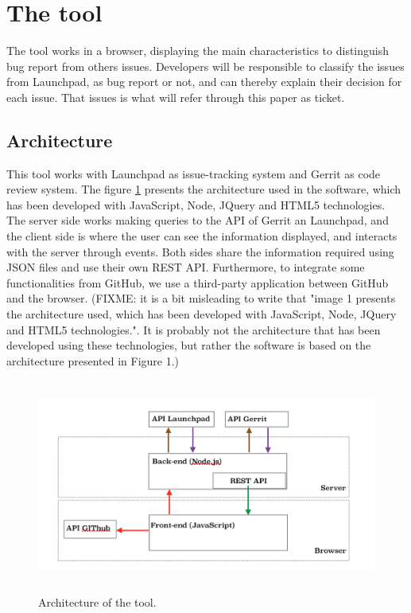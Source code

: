 \documentclass[ifip]{svmult}
\begin{document}
\section{The tool}
\label{sec:2}

The tool works in a browser, displaying the main characteristics to distinguish bug report from others issues. Developers will be responsible to classify the issues from Launchpad, as bug report or not, and can thereby explain their decision for each issue. That issues is what will refer through this paper as ticket.


\subsection{Architecture}

This tool works with Launchpad as issue-tracking system and Gerrit as code review system. The figure \ref{fig:1} presents the architecture used in the software, which has been developed with JavaScript, Node, JQuery and HTML5 technologies. The server side works making queries to the API of Gerrit an Launchpad, and the client side is where the user can see the information displayed, and interacts with the server through events. Both sides share the information required using JSON files and use their own REST API. Furthermore, to integrate some functionalities from GitHub, we use a third-party application between GitHub and the browser. (FIXME: it is a bit misleading to write that "image 1 presents the architecture used, which has been developed with JavaScript, Node, JQuery and HTML5 technologies.". It is probably not the architecture that has been developed using these technologies, but rather the software is based on the architecture presented in Figure 1.)

\label{sec:2.1}
\begin{figure}
\centering
\includegraphics[height=7cm]{Arquitectura.png}
\caption{Architecture of the tool.}
\label{fig:1}       %
\end{figure}
\end{document}
